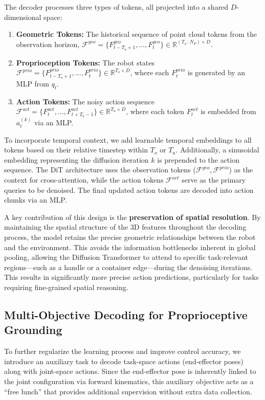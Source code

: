 \documentclass[runningheads]{llncs}
\begin{document}
The decoder processes three types of tokens, all projected into a shared $D$-dimensional space:
\begin{enumerate}
    \item \textbf{Geometric Tokens:} The historical sequence of point cloud tokens from the observation horizon, $\mathcal{F}^{geo} = \{F^{geo}_{t-T_o+1}, \dots, F^{geo}_t\} \in \mathbb{R}^{(T_o \cdot N_P) \times D}$.
    \item \textbf{Proprioception Tokens:} The robot states $\mathcal{F}^{prio} = \{F^{prio}_{t-T_o+1}, \dots, F^{prio}_t\} \in \mathbb{R}^{T_o \times D}$, where each $F^{prio}_t$ is generated by an MLP from $q_t$.
    \item \textbf{Action Tokens:} The noisy action sequence $\mathcal{F}^{act} = \{F^{act}_{t}, \dots, F^{act}_{t+T_a-1}\} \in \mathbb{R}^{T_a \times D}$, where each token $F^{act}_t$ is embedded from $a^{(k)}_t$ via an MLP.
\end{enumerate}

To incorporate temporal context, we add learnable temporal embeddings to all tokens based on their relative timestep within $T_o$ or $T_a$. Additionally, a sinusoidal embedding representing the diffusion iteration $k$ is prepended to the action sequence. The DiT architecture uses the observation tokens ($\mathcal{F}^{geo}, \mathcal{F}^{prio}$) as the context for cross-attention, while the action tokens $\mathcal{F}^{act}$ serve as the primary queries to be denoised. The final updated action tokens are decoded into action chunks via an MLP.

A key contribution of this design is the \textbf{preservation of spatial resolution}. By maintaining the spatial structure of the 3D features throughout the decoding process, the model retains the precise geometric relationships between the robot and the environment. This avoids the information bottlenecks inherent in global pooling, allowing the Diffusion Transformer to attend to specific task-relevant regions—such as a handle or a container edge—during the denoising iterations. This results in significantly more precise action predictions, particularly for tasks requiring fine-grained spatial reasoning. 

\subsection{Multi-Objective Decoding for Proprioceptive Grounding}
\label{sec:auxiliary}
To further regularize the learning process and improve control accuracy, we introduce an auxiliary task to decode task-space actions (end-effector poses) along with joint-space actions. Since the end-effector pose is inherently linked to the joint configuration via forward kinematics, this auxiliary objective acts as a ``free lunch'' that provides additional supervision without extra data collection.
\end{document}
